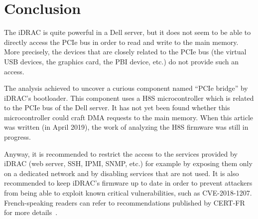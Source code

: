 \section{Conclusion}

The iDRAC is quite powerful in a Dell server, but it does not seem to be able to directly access the PCIe bus in order to read and write to the main memory.
More precisely, the devices that are closely related to the PCIe bus (the virtual USB devices, the graphics card, the PBI device, etc.) do not provide such an access.

The analysis achieved to uncover a curious component named ``PCIe bridge'' by iDRAC's bootloader.
This component uses a H8S microcontroller which is related to the PCIe bus of the Dell server.
It has not yet been found whether this microcontroller could craft DMA requests to the main memory.
When this article was written (in April 2019), the work of analyzing the H8S firmware was still in progress.

Anyway, it is recommended to restrict the access to the services provided by iDRAC (web server, SSH, IPMI, SNMP, etc.) for example by exposing them only on a dedicated network and by disabling services that are not used.
It is also recommended to keep iDRAC's firmware up to date in order to prevent attackers from being able to exploit known critical vulnerabilities, such as CVE-2018-1207.
French-speaking readers can refer to recommendations published by CERT-FR for more details~\cite{idrackar:certfr2017ipmi}.


\appendix



